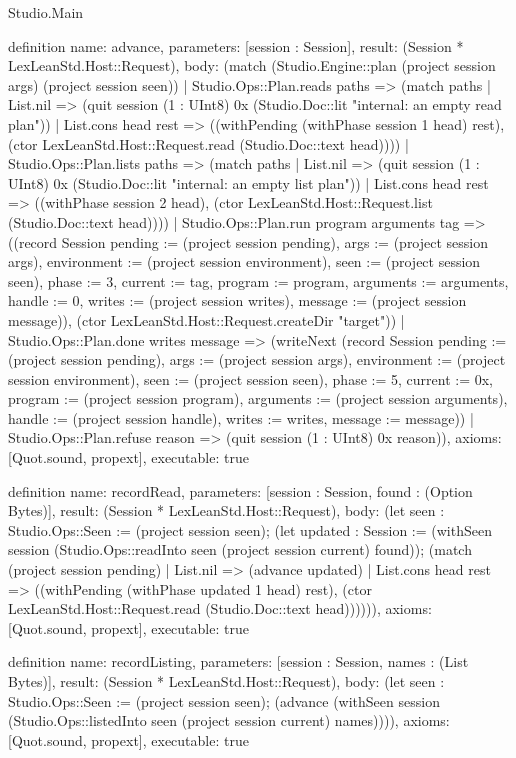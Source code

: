 \begin{lexlean}{Studio.Main}
\begin{semanticmodule}
definition{
  name: advance,
  parameters: [session : Session],
  result: (Session * LexLeanStd.Host::Request),
  body: (match (Studio.Engine::plan (project session args) (project session seen))
    | Studio.Ops::Plan.reads paths => (match paths
      | List.nil => (quit session (1 : UInt8) 0x (Studio.Doc::lit "internal: an empty read plan\n"))
      | List.cons head rest => ((withPending (withPhase session 1 head) rest), (ctor LexLeanStd.Host::Request.read (Studio.Doc::text head))))
    | Studio.Ops::Plan.lists paths => (match paths
      | List.nil => (quit session (1 : UInt8) 0x (Studio.Doc::lit "internal: an empty list plan\n"))
      | List.cons head rest => ((withPhase session 2 head), (ctor LexLeanStd.Host::Request.list (Studio.Doc::text head))))
    | Studio.Ops::Plan.run program arguments tag => ((record Session {pending := (project session pending), args := (project session args), environment := (project session environment), seen := (project session seen), phase := 3, current := tag, program := program, arguments := arguments, handle := 0, writes := (project session writes), message := (project session message)}), (ctor LexLeanStd.Host::Request.createDir "target"))
    | Studio.Ops::Plan.done writes message => (writeNext (record Session {pending := (project session pending), args := (project session args), environment := (project session environment), seen := (project session seen), phase := 5, current := 0x, program := (project session program), arguments := (project session arguments), handle := (project session handle), writes := writes, message := message}))
    | Studio.Ops::Plan.refuse reason => (quit session (1 : UInt8) 0x reason)),
  axioms: [Quot.sound, propext],
  executable: true
}

definition{
  name: recordRead,
  parameters: [session : Session, found : (Option Bytes)],
  result: (Session * LexLeanStd.Host::Request),
  body: (let seen : Studio.Ops::Seen := (project session seen); (let updated : Session := (withSeen session (Studio.Ops::readInto seen (project session current) found)); (match (project session pending)
    | List.nil => (advance updated)
    | List.cons head rest => ((withPending (withPhase updated 1 head) rest), (ctor LexLeanStd.Host::Request.read (Studio.Doc::text head)))))),
  axioms: [Quot.sound, propext],
  executable: true
}

definition{
  name: recordListing,
  parameters: [session : Session, names : (List Bytes)],
  result: (Session * LexLeanStd.Host::Request),
  body: (let seen : Studio.Ops::Seen := (project session seen); (advance (withSeen session (Studio.Ops::listedInto seen (project session current) names)))),
  axioms: [Quot.sound, propext],
  executable: true
}


\end{semanticmodule}
\end{lexlean}
